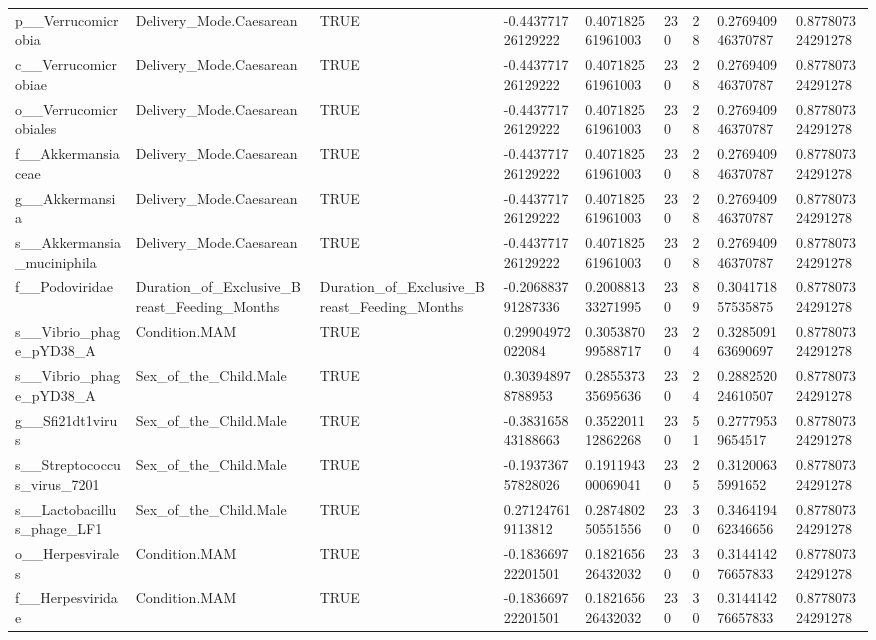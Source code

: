 \begin{longtable}{lllllllll}
p\_\_Verrucomicrobia & Delivery\_Mode.Caesarean & TRUE & -0.443771726129222 & 0.407182561961003 & 230 & 28 & 0.276940946370787 & 0.877807324291278 \\
c\_\_Verrucomicrobiae & Delivery\_Mode.Caesarean & TRUE & -0.443771726129222 & 0.407182561961003 & 230 & 28 & 0.276940946370787 & 0.877807324291278 \\
o\_\_Verrucomicrobiales & Delivery\_Mode.Caesarean & TRUE & -0.443771726129222 & 0.407182561961003 & 230 & 28 & 0.276940946370787 & 0.877807324291278 \\
f\_\_Akkermansiaceae & Delivery\_Mode.Caesarean & TRUE & -0.443771726129222 & 0.407182561961003 & 230 & 28 & 0.276940946370787 & 0.877807324291278 \\
g\_\_Akkermansia & Delivery\_Mode.Caesarean & TRUE & -0.443771726129222 & 0.407182561961003 & 230 & 28 & 0.276940946370787 & 0.877807324291278 \\
s\_\_Akkermansia\_muciniphila & Delivery\_Mode.Caesarean & TRUE & -0.443771726129222 & 0.407182561961003 & 230 & 28 & 0.276940946370787 & 0.877807324291278 \\
f\_\_Podoviridae & Duration\_of\_Exclusive\_Breast\_Feeding\_Months & Duration\_of\_Exclusive\_Breast\_Feeding\_Months & -0.206883791287336 & 0.200881333271995 & 230 & 89 & 0.304171857535875 & 0.877807324291278 \\
s\_\_Vibrio\_phage\_pYD38\_A & Condition.MAM & TRUE & 0.29904972022084 & 0.305387099588717 & 230 & 24 & 0.328509163690697 & 0.877807324291278 \\
s\_\_Vibrio\_phage\_pYD38\_A & Sex\_of\_the\_Child.Male & TRUE & 0.303948978788953 & 0.285537335695636 & 230 & 24 & 0.288252024610507 & 0.877807324291278 \\
g\_\_Sfi21dt1virus & Sex\_of\_the\_Child.Male & TRUE & -0.383165843188663 & 0.352201112862268 & 230 & 51 & 0.27779539654517 & 0.877807324291278 \\
s\_\_Streptococcus\_virus\_7201 & Sex\_of\_the\_Child.Male & TRUE & -0.193736757828026 & 0.191194300069041 & 230 & 25 & 0.31200635991652 & 0.877807324291278 \\
s\_\_Lactobacillus\_phage\_LF1 & Sex\_of\_the\_Child.Male & TRUE & 0.271247619113812 & 0.287480250551556 & 230 & 30 & 0.346419462346656 & 0.877807324291278 \\
o\_\_Herpesvirales & Condition.MAM & TRUE & -0.183669722201501 & 0.182165626432032 & 230 & 30 & 0.314414276657833 & 0.877807324291278 \\
f\_\_Herpesviridae & Condition.MAM & TRUE & -0.183669722201501 & 0.182165626432032 & 230 & 30 & 0.314414276657833 & 0.877807324291278 \\

\end{longtable}
